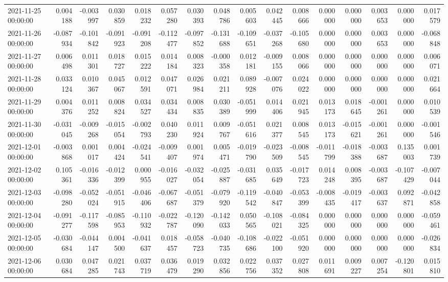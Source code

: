 \begin{tabular}{lrrrrrrrrrrrrrrr}
2021-11-25 00:00:00 & 0.004188 & -0.003997 & 0.030859 & 0.018232 & 0.057280 & 0.030393 & 0.048786 & 0.005603 & 0.042445 & 0.008666 & 0.000000 & 0.000000 & 0.003653 & 0.000000 & 0.017579 \\
2021-11-26 00:00:00 & -0.087934 & -0.101842 & -0.091923 & -0.091208 & -0.112477 & -0.097852 & -0.131688 & -0.109651 & -0.037268 & -0.105680 & 0.000000 & 0.000000 & 0.003653 & 0.000000 & -0.068848 \\
2021-11-27 00:00:00 & 0.006498 & 0.011301 & 0.018727 & 0.015222 & 0.014184 & 0.008323 & -0.000358 & 0.012181 & -0.009155 & 0.008066 & 0.000000 & 0.000000 & 0.000000 & 0.000000 & 0.006071 \\
2021-11-28 00:00:00 & 0.033124 & 0.010367 & 0.045067 & 0.012591 & 0.047071 & 0.026984 & 0.021211 & 0.089928 & -0.007076 & 0.024022 & 0.000000 & 0.000000 & 0.000000 & 0.000000 & 0.021664 \\
2021-11-29 00:00:00 & 0.004376 & 0.011252 & 0.008824 & 0.034527 & 0.034434 & 0.008835 & 0.030389 & -0.051999 & 0.014406 & 0.021945 & 0.013173 & 0.018645 & -0.001261 & 0.000000 & 0.010539 \\
2021-11-30 00:00:00 & -0.031045 & -0.009268 & -0.015054 & -0.002793 & 0.040230 & 0.011924 & 0.009767 & -0.051616 & 0.021377 & 0.008545 & 0.013173 & -0.015621 & -0.001261 & 0.000000 & -0.001546 \\
2021-12-01 00:00:00 & -0.003868 & 0.001017 & 0.004424 & -0.024541 & -0.009407 & 0.001974 & 0.005471 & -0.019790 & -0.023509 & -0.008545 & -0.011799 & -0.018388 & -0.003687 & 0.135003 & 0.001739 \\
2021-12-02 00:00:00 & 0.105361 & -0.016336 & -0.012399 & 0.000955 & -0.016027 & -0.032054 & -0.025887 & -0.031685 & 0.035649 & -0.017723 & 0.014248 & 0.008395 & -0.003687 & -0.107429 & -0.007044 \\
2021-12-03 00:00:00 & -0.098280 & -0.052024 & -0.051915 & -0.046406 & -0.067687 & -0.051379 & -0.079920 & -0.119542 & -0.040847 & -0.053399 & -0.008435 & -0.019417 & -0.003637 & 0.092871 & -0.042858 \\
2021-12-04 00:00:00 & -0.091277 & -0.117598 & -0.085953 & -0.110932 & -0.022787 & -0.120090 & -0.142033 & 0.050565 & -0.108021 & -0.084325 & 0.000000 & 0.000000 & 0.000000 & 0.000000 & -0.059461 \\
2021-12-05 00:00:00 & -0.030684 & -0.044147 & 0.004500 & -0.041637 & 0.018457 & -0.058723 & -0.040735 & -0.108686 & -0.022100 & -0.051920 & 0.000000 & 0.000000 & 0.000000 & 0.000000 & -0.026834 \\
2021-12-06 00:00:00 & 0.030684 & 0.047285 & 0.021743 & 0.037719 & 0.036479 & 0.019290 & 0.032856 & 0.022756 & 0.037352 & 0.027808 & 0.011691 & 0.009227 & 0.007254 & -0.120801 & 0.015810 \\

\end{tabular}
